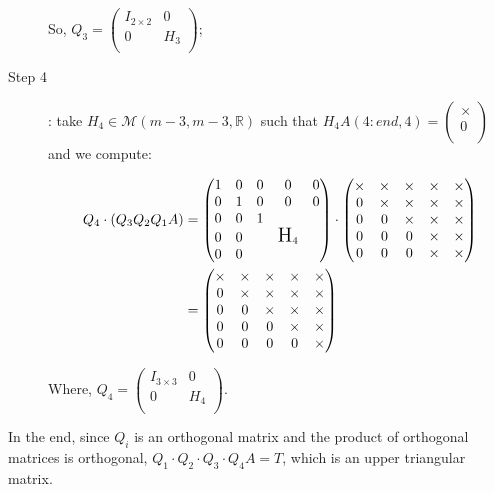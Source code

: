 \documentclass[computational_mathematics.tex]{subfiles}
\begin{document}
\begin{example}
\begin{description}
      So, $Q_{3} =
      \begin{pmatrix}
        I_{2 \times 2} & 0\\
        0 & H_{3}\\
      \end{pmatrix}$;

  \item[{\sc Step 4}]: take $H_{4} \in \mathcal{M}(m-3, m-3, \mathds{R})$ such that $H_{4}A(4:end, 4) = \begin{pmatrix} \times\\ 0\\ \end{pmatrix}$ and we compute:

   \begin{equation}
        \begin{aligned}
          Q_4 \cdot (Q_3 Q_2 Q_1 A)
          &=  \begin{pmatrix}
          1 & 0 & 0 & 0 & 0\\
          0 & 1 & 0 & 0 & 0\\
          0 & 0 & 1 & \\
          0 & 0 && \text{\Large H}_4\\
          0 & 0 &&\\
        \end{pmatrix} \cdot  \begin{pmatrix}
          \times & \times & \times & \times & \times\\
          0 & \times & \times & \times & \times\\
          0 & 0 & \times & \times & \times\\
          0 & 0 & 0 & \times & \times\\
          0 & 0 & 0 & \times & \times\\
        \end{pmatrix}\\
        &= \begin{pmatrix}
          \times & \times & \times & \times & \times\\
          0 & \times & \times & \times & \times\\
          0 & 0 & \times & \times & \times\\
          0 & 0 & 0 & \times & \times\\
          0 & 0 & 0 & 0 & \times\\
        \end{pmatrix}
        \end{aligned}
      \end{equation}

Where, $Q_{4} =
      \begin{pmatrix}
        I_{3 \times 3} & 0\\
        0 & H_{4}\\
      \end{pmatrix}$. 
\end{description}

  In the end, since $Q_{i}$ is an orthogonal matrix and the product of orthogonal matrices is orthogonal, $Q_{1} \cdot Q_{2} \cdot Q_{3} \cdot Q_{4} A = T$, which is an upper triangular matrix.
\end{example}
\end{document}
